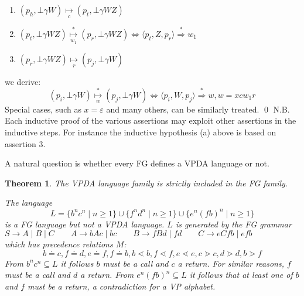 \documentclass[3p,11pt]{elsarticle}
\newtheorem{theorem}{Theorem}[section]
\newenvironment{proof}[1][Proof]{\begin{trivlist}
\item[\hskip \labelsep {\bfseries #1}]}{\end{trivlist}}
\begin{document}
\begin{enumerate}
\begin{enumerate}
        \item  $(p_h, \bot \gamma W)  \underset{c}{\mapsto} (p_t, \bot \gamma WZ)$

        \item  $(p_t, \bot \gamma WZ)\underset{w_1}{\stackrel*\mapsto} (p_r, \bot \gamma WZ)\iff
            \langle p_t,Z, p_r\rangle \stackrel{\ast}{\Rightarrow} w_1$

        \item  $(p_r, \bot \gamma W Z)  \underset{r}{\mapsto} (p_j, \bot \gamma W)$

    \end{enumerate}
\end{enumerate}
we derive:
\begin{equation}\label{lastImplication}
 (p_i, \bot \gamma W)  \underset{w}{\stackrel*\mapsto}  (p_j, \bot \gamma W) \iff
 \langle p_i,W, p_j\rangle \stackrel{\ast}{\Rightarrow} w, w = xc w_1 r
\end{equation}
Special cases, such as $x=\varepsilon$ and many others, can be similarly treated.
 \qed
 N.B. Each inductive proof of the various assertions may exploit other assertions in the inductive steps.
 For instance the inductive hypothesis (a) above is based on assertion 3.
\par
\label{SectStrictInclus} A natural question is whether every FG defines a VPDA language or not.
\begin{theorem}\label{TheorStrictInclusion}
The VPDA language family is strictly included in the FG family.
\begin{proof}
\label{ProposCounterexample} The  language
$$
L=\{b^n c^n \mid n\geq 1\}\cup \{f^n d^n \mid n\geq 1\}\cup \{e^n (fb)^n \mid n\geq 1\}
$$
is a FG language  but not a VPDA language.
 $L$ is generated by the FG grammar\\
$ S\to A\mid B \mid C \qquad A\to bAc\mid bc \qquad B\to fBd\mid fd \qquad C\to eCfb\mid efb $
\\
which has precedence relations $M$:
$$
b\doteq c, f\doteq d, e\doteq f, f\doteq b, b\lessdot b, f\lessdot f, e\lessdot e,  c\gtrdot c, d\gtrdot d, b\gtrdot f
$$
From $b^n c^n \subseteq L$ it follows $b$ must be a call and $c$ a return. For similar reasons, $f$ must be a call and $d$ a return. From $e^n (fb)^n \subseteq L$ it follows that at least one of $b$ and $f$ must be a return, a contradiction for a VP alphabet.
\end{proof}
\end{theorem}
\end{document}
